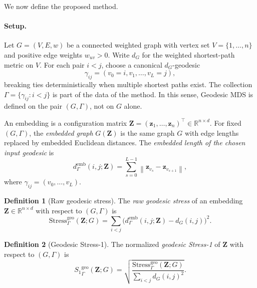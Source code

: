 \documentclass[11pt]{article}
\newcommand{\R}{\mathbb{R}}
\newcommand{\bz}{\mathbf{z}}
\newcommand{\bZ}{\mathbf{Z}}
\newcommand{\norm}[1]{\left\|#1\right\|}
\newcommand{\demb}{d^{\mathrm{emb}}}
\newcommand{\Stress}{\mathrm{Stress}}
\newcommand{\StressOne}{S_1}
\theoremstyle{definition}
\newtheorem{definition}{Definition}[section]
\theoremstyle{plain}
\theoremstyle{remark}
\begin{document}
We now define the proposed method.

\paragraph{Setup.}
Let $G = (V,E,w)$ be a connected weighted graph with vertex set
$V = \{1,\ldots,n\}$ and positive edge weights $w_{uv} > 0$.  Write
$d_G$ for the weighted shortest-path metric on $V$.  For each pair
$i < j$, choose a canonical $d_G$-geodesic
\begin{equation}
  \gamma_{ij} = (v_0 = i, v_1, \ldots, v_L = j),
  \label{eq:canonical_geodesic}
\end{equation}
breaking ties deterministically when multiple shortest paths exist.  The
collection $\Gamma = \{\gamma_{ij} : i < j\}$ is part of the data of the
method.  In this sense, Geodesic MDS is defined on the pair $(G,\Gamma)$,
not on $G$ alone.

An embedding is a configuration matrix $\bZ = (\bz_1, \ldots, \bz_n)^\top
\in \R^{n \times d}$.  For fixed $(G,\Gamma)$, the \emph{embedded graph}
$G(\bZ)$ is the same graph $G$ with edge lengths replaced by embedded
Euclidean distances.  The \emph{embedded length of the chosen input
geodesic} is
\begin{equation}
  \demb_{\Gamma}(i,j;\bZ)
  = \sum_{s=0}^{L-1} \norm{\bz_{v_s} - \bz_{v_{s+1}}},
  \label{eq:emb_geodesic}
\end{equation}
where $\gamma_{ij} = (v_0, \ldots, v_L)$.

\begin{definition}[Raw geodesic stress]
  \label{def:raw_geodesic_stress}
  The \emph{raw geodesic stress} of an embedding $\bZ \in \R^{n \times d}$
  with respect to $(G,\Gamma)$ is
  \begin{equation}
    \Stress^{\mathrm{geo}}_{\Gamma}(\bZ; G)
    = \sum_{i < j}
      \bigl(\demb_{\Gamma}(i,j;\bZ) - d_G(i,j)\bigr)^2.
    \label{eq:raw_geo_stress}
  \end{equation}
\end{definition}

\begin{definition}[Geodesic Stress-1]
  \label{def:geodesic_stress}
  The normalized \emph{geodesic Stress-1} of $\bZ$ with respect to
  $(G,\Gamma)$ is
  \begin{equation}
    {\StressOne}_{\Gamma}^{\mathrm{geo}}(\bZ; G)
    = \sqrt{
        \frac{\Stress^{\mathrm{geo}}_{\Gamma}(\bZ; G)}
             {\displaystyle\sum_{i < j} d_G(i,j)^2}
      }.
    \label{eq:geo_stress}
  \end{equation}
\end{definition}
\end{document}
